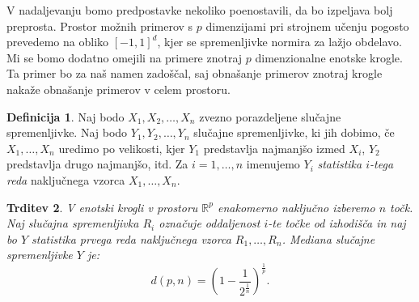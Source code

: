 \documentclass[12pt,a4paper,twoside]{article}
\theoremstyle{definition} %
\newtheorem{definicija}{Definicija}[section]
\theoremstyle{plain} %
\newtheorem{trditev}[definicija]{Trditev}
\numberwithin{equation}{section}  %
\begin{document}
V nadaljevanju bomo predpostavke nekoliko poenostavili, da bo izpeljava bolj preprosta. 
Prostor možnih primerov s $p$ dimenzijami pri strojnem učenju pogosto prevedemo na obliko $[-1, 1]^d$, kjer se spremenljivke normira za lažjo obdelavo. 
Mi se bomo dodatno omejili na primere znotraj $p$ dimenzionalne enotske krogle. 
Ta primer bo za naš namen zadoščal, saj obnašanje primerov znotraj krogle nakaže obnašanje primerov v celem prostoru.


\begin{definicija}
\label{def:statistika}
	Naj bodo $X_1, X_2, \ldots, X_n$ zvezno porazdeljene slučajne spremenljivke.
	Naj bodo $Y_1, Y_2, \ldots, Y_n$ slučajne spremenljivke, ki jih dobimo, če $X_1, \ldots, X_n$ uredimo po velikosti, kjer $Y_1$ predstavlja najmanjšo izmed $X_i$, $Y_2$ predstavlja drugo najmanjšo, itd.
	Za $i=1,\ldots,n$ imenujemo $Y_i$ \emph{statistika $i$-tega reda} naključnega vzorca $X_1, \ldots, X_n$.
\end{definicija}

\begin{trditev}
\label{trd:prekletstvo_dim}
	V enotski krogli v prostoru $\mathbb{R}^p$ enakomerno naključno izberemo $n$ točk.
	Naj slučajna spremenljivka $R_i$ označuje oddaljenost $i$-te točke od izhodišča in naj bo $Y$ statistika prvega reda naključnega vzorca $R_1, \ldots, R_n$. %
	Mediana slučajne spremenljivke $Y$ je:
	\[
		d(p,n) = (1 - \frac{1}{2^{\frac{1}{n}}})^{\frac{1}{p}}.
	\]
\end{trditev}
\end{document}
